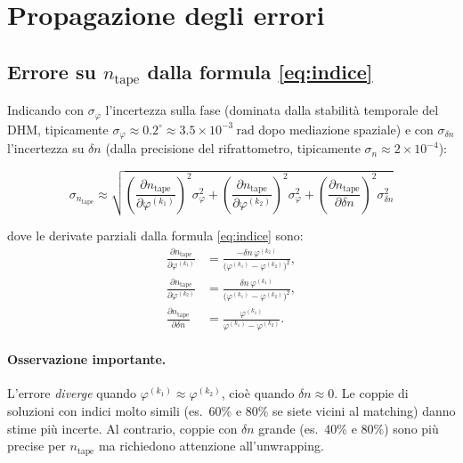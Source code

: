 \section{Propagazione degli errori}

\subsection{Errore su $n_\text{tape}$ dalla formula \eqref{eq:indice}}

Indicando con $\sigma_\varphi$ l'incertezza sulla fase (dominata dalla
stabilità temporale del DHM, tipicamente $\sigma_\varphi \approx 0.2^\circ
\approx 3.5 \times 10^{-3}\ \text{rad}$ dopo mediazione spaziale) e con
$\sigma_{\delta n}$ l'incertezza su $\delta n$ (dalla precisione del
rifrattometro, tipicamente $\sigma_n \approx 2\times10^{-4}$):

\[
  \sigma_{n_\text{tape}} \approx
  \sqrt{
    \left(\frac{\partial n_\text{tape}}{\partial \varphi^{(k_1)}}\right)^2 \sigma_\varphi^2
    + \left(\frac{\partial n_\text{tape}}{\partial \varphi^{(k_2)}}\right)^2 \sigma_\varphi^2
    + \left(\frac{\partial n_\text{tape}}{\partial \delta n}\right)^2 \sigma_{\delta n}^2
  }
\]

dove le derivate parziali dalla formula \eqref{eq:indice} sono:
\begin{align*}
  \frac{\partial n_\text{tape}}{\partial \varphi^{(k_1)}}
  &= \frac{-\delta n\, \varphi^{(k_2)}}{\bigl(\varphi^{(k_1)}-\varphi^{(k_2)}\bigr)^2},\\
  \frac{\partial n_\text{tape}}{\partial \varphi^{(k_2)}}
  &= \frac{\delta n\, \varphi^{(k_1)}}{\bigl(\varphi^{(k_1)}-\varphi^{(k_2)}\bigr)^2},\\
  \frac{\partial n_\text{tape}}{\partial \delta n}
  &= \frac{\varphi^{(k_1)}}{\varphi^{(k_1)}-\varphi^{(k_2)}}.
\end{align*}

\paragraph{Osservazione importante.}
L'errore \textit{diverge} quando $\varphi^{(k_1)} \approx \varphi^{(k_2)}$,
cioè quando $\delta n \approx 0$. Le coppie di soluzioni con indici molto
simili (es.\ 60\% e 80\% se siete vicini al matching) danno stime più incerte.
Al contrario, coppie con $\delta n$ grande (es.\ 40\% e 80\%) sono più precise
per $n_\text{tape}$ ma richiedono attenzione all'unwrapping.

